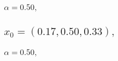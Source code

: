 \documentclass[a4paper]{article}
\begin{document}
\begin{multicols*}{2}
   \subsubsection{\(\alpha = 0.50,\quad \)}
   

   \subsection{\(x_0 = (0.17,0.50,0.33),\quad \)}
   

   \subsubsection{\(\alpha = 0.50,\quad \)}
   
%
   \end{multicols*}
   
\end{document}
